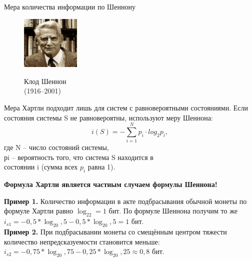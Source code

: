 \begin{frame}[t]{Мера количества информации по Шеннону}
\small
\begin{figure}
	\vskip -1cm
	\includegraphics[width=2.8cm]{shannon.png}
	\begin{center}
		\vskip -0.3cm
		Клод Шеннон\\
		(1916--2001)
	\end{center}
\end{figure}
\noindent Мера Хартли подходит лишь для систем с равновероятными состояниями.
Если состояния системы S не равновероятны, используют меру Шеннона:
$$i(S)=-\sum_{i=1}^Np_i\cdot log_2p_i,$$
где N – число состояний системы,\\
\noindent рi – вероятность того, что система S находится в\\
состоянии i (сумма всех $p_i$ равна 1).
\vspace{0.2cm}
\begin{center}
	\textbf{Формула Хартли является частным случаем формулы Шеннона!}
	\color{black}
\end{center}
\noindent\textbf{Пример 1.} Количество информации в акте подбрасывания обычной монеты по формуле Хартли равно $\log_22=1$ бит. По формуле Шеннона получим то же $i_{s1}=-0,5*\log_20,5-0,5*\log_20,5=1$ бит.\\
\noindent\textbf{Пример 2.} При подбрасывании монеты со смещённым центром тяжести количество непредсказуемости становится меньше: $i_{s2}=-0,75*\log_20,75-0,25*\log_20,25\approx0,8$ бит.
\end{frame}